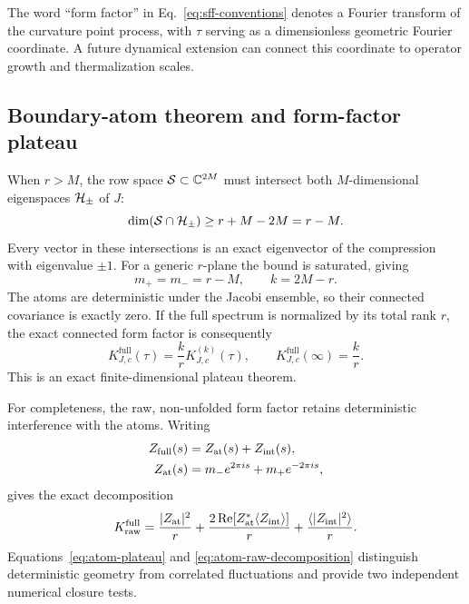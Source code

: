The word ``form factor'' in Eq.~\eqref{eq:sff-conventions} denotes a Fourier
transform of the curvature point process, with \(\tau\) serving as a
dimensionless geometric Fourier coordinate.  A future dynamical extension
can connect this coordinate to operator growth and thermalization scales.

\subsection{Boundary-atom theorem and form-factor plateau}
\label{sec:atom-theorem}

When \(r>M\), the row space \(\mathcal{S}\subset\mathbb C^{2M}\) must intersect both
\(M\)-dimensional eigenspaces \(\mathcal{H}_\pm\) of \(J\):
\begin{equation}
 \dim(\mathcal{S}\cap\mathcal{H}_\pm)\geq r+M-2M=r-M .
 \label{eq:intersection-bound}
\end{equation}
Every vector in these intersections is an exact eigenvector of the
compression with eigenvalue \(\pm1\).
For a generic \(r\)-plane the bound is saturated, giving
\begin{equation}
 m_+=m_-=r-M,\qquad k=2M-r.
 \label{eq:atom-count}
\end{equation}
The atoms are deterministic under the Jacobi ensemble, so their connected
covariance is exactly zero.
If the full spectrum is normalized by its total rank \(r\), the exact
connected form factor is consequently
\begin{equation}
 K_{J,c}^{\mathrm{full}}(\tau)
 =\frac{k}{r}K_{J,c}^{(k)}(\tau),\qquad
 K_{J,c}^{\mathrm{full}}(\infty)=\frac{k}{r}.
 \label{eq:atom-plateau}
\end{equation}
This is an exact finite-dimensional plateau theorem.

For completeness, the raw, non-unfolded form factor retains deterministic
interference with the atoms.
Writing
\begin{equation}
 \begin{aligned}
 Z_{\rm full}(s)&=Z_{\rm at}(s)+Z_{\rm int}(s),\\
 Z_{\rm at}(s)&=m_-e^{2\pi i s}+m_+e^{-2\pi i s},
 \end{aligned}
 \label{eq:atom-partition}
\end{equation}
gives the exact decomposition
\begin{equation}
 K_{\rm raw}^{\rm full}
 =\frac{|Z_{\rm at}|^2}{r}
 +\frac{2\,\mathrm{Re}\!\left[
 Z_{\rm at}^{*}\langle Z_{\rm int}\rangle\right]}{r}
 +\frac{\langle|Z_{\rm int}|^2\rangle}{r}.
 \label{eq:atom-raw-decomposition}
\end{equation}
Equations~\eqref{eq:atom-plateau} and
\eqref{eq:atom-raw-decomposition} distinguish deterministic geometry from
correlated fluctuations and provide two independent numerical closure tests.
